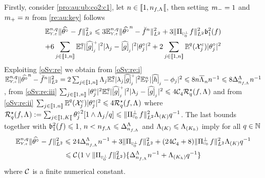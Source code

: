 \begin{pro}
Firstly, consider \ref{pro:au:ub:co2:c1},  let
$\ssY\in\nsetro{1,\ssY_{\xdf,\iSv}}$, then setting $\mDi=1$ and
$\pDi=\ssY$ from \cref{re:au:key} follows
\begin{multline*}
\FuEx[\ssY,\ssE]{\rY,\rE}\VnormLp{\hxdfPr[]-\xdf}^2\leq 
3\FuEx[\ssY,\ssE]{\rY,\rE}\VnormLp{\hxdfPr[\ssY]-\dxdfPr[\ssY]}^2
+3 \VnormLp{\Proj[{\mHiH[0]^\perp}]\xdf}^2\bias[1]^2(\xdf)\\
+6\sum_{j\in\nset{1,\ssY}}\FuEx[\ssE]{\rE}|\hfedfmpI[j]|^2|\fedf[j]-\hfedf[j]|^2|\fxdf[j]|^2
+2\sum_{j\in\nset{1,\ssY}}\FuVg[\ssE]{\rE}(\xEv^c)|\fxdf[j]|^2
\end{multline*}
Exploiting \cref{oSv:re} we obtain from 
\ref{oSv:re:i}
$\FuEx[\ssY,\ssE]{\rY,\rE}\VnormLp{\hxdfPr[\ssY]-\dxdfPr[\ssY]}^2=
2\sum_{j\in\nset{1,n}}\iSv[j]\FuEx[\ssE]{\rE}|\fedf[j]\hfedfmpI[j]|^2\FuEx[\ssY]{\rY}|\hfydf[j]-\fydf[j]|^2\leq8\ssY\oiSv[\ssY]\ssY^{-1}\leq 8\DipenSv[\ssY_{\xdf,\iSv}]\ssY^{-1}$, 
from \ref{oSv:re:iii}
$\sum_{j\in\nset{1,\ssY}}|\fxdf[j]|^2\FuEx[\ssE]{\rE}|\hfedfmpI[j]|^2|\fedf[j]-\hfedf[j]|^2\leq4\cst{4}\mRa{\xdf,\iSv}$
and from
\ref{oSv:re:ii}
$\sum_{j\in\nset{1,n}}\FuVg[\ssE]{\rE}(\xEv^c)|\fxdf[j]|^2
\leq4\mRa{\xdf,\iSv}$ where  $\mRa{\xdf,\iSv}:=\sum_{j\in\nsetro{1,K}}\fxdf[j]^2[1\wedge
\iSv[j]/\ssE]\leq\VnormLp{\Proj[{\mHiH[0]}]^\perp\xdf}^2\miSv[K]\ssE^{-1}$. The
last bounds together with $\bias[1]^2(\xdf)\leq1$, $\ssY<\ssY_{\xdf,\iSv}\leq\DipenSv[\ssY_{\xdf,\iSv}]$ and $\miSv[K]\leq\miSv[K_{\ydf}]$ imply for all $\ssE\in\Nz$
\begin{multline}\label{pro:au:ub:co2:e1}
\FuEx[\ssY,\ssE]{\rY,\rE}\VnormLp{\hxdfPr[]-\xdf}^2\leq 
24\DipenSv[\ssY_{\xdf,\iSv}]\ssY^{-1}+3 \VnormLp{\Proj[{\mHiH[0]^\perp}]\xdf}^2
+(24\cst{4}+8)\VnormLp{\Proj[{\mHiH[0]}]^\perp\xdf}^2\miSv[K]\ssE^{-1}\\\leq \cst{}(1\vee\VnormLp{\Proj[{\mHiH[0]^\perp}]\xdf}^2)\{\DipenSv[\ssY_{\xdf,\iSv}]\ssY^{-1}+\miSv[K_{\ydf}]\ssE^{-1}\}
\end{multline}
where $\cst{}$ is a finite numerical constant.


\end{pro}
